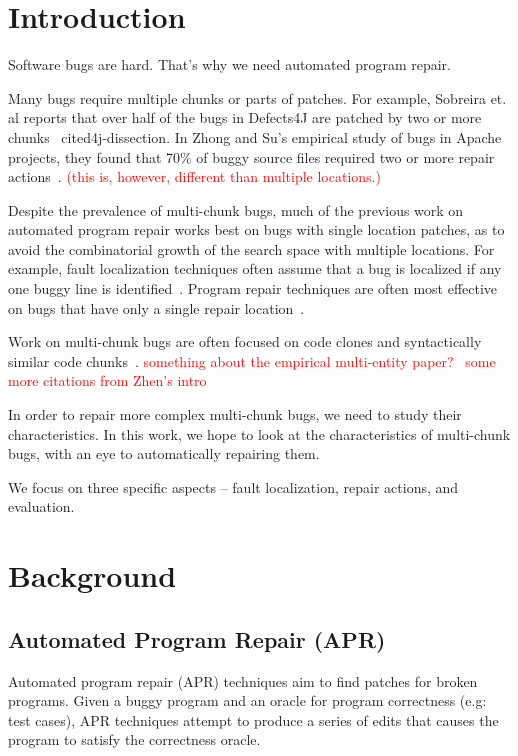 \documentclass[sigconf, timestamp-false, anonymous=true]{acmart}
\newcommand\todo[1]{\textcolor{red}{#1}}
\begin{document}

\maketitle

\section{Introduction}

Software bugs are hard. That's why we need automated program repair.

Many bugs require multiple chunks or parts of patches. For example, Sobreira et. al reports that over half of the bugs in Defects4J are patched by two or more chunks ~cite{d4j-dissection}. In Zhong and Su's empirical study of bugs in Apache projects, they found that 70\% of buggy source files required two or more repair actions~\cite{zhong2015}. \todo{(this is, however, different than multiple locations.)}

Despite the prevalence of multi-chunk bugs, much of the previous work on automated program repair works best on bugs with single location patches, as to avoid the combinatorial growth of the search space with multiple locations. For example, fault localization techniques often assume that a bug is localized if any one buggy line is identified~\cite{fl-survey-wong}. Program repair techniques are often most effective on bugs that have only a single repair location~\cite{rsrepair, ae, hdrepair}.

Work on multi-chunk bugs are often focused on code clones and syntactically similar code chunks~\cite{saha2019harnessing,jiang2019cmsuggester}. \todo{something about the empirical multi-entity paper?~\cite{wang2018}} \todo{some more citations from Zhen's intro~\cite{fl-multi-faults, patch-correctness, Le2018}}

In order to repair more complex multi-chunk bugs, we need to study their characteristics. In this work, we hope to look at the characteristics of multi-chunk bugs, with an eye to automatically repairing them.

We focus on three specific aspects -- fault localization, repair actions, and evaluation.


\section{Background}
\subsection{Automated Program Repair (APR)}
Automated program repair (APR) techniques aim to find patches for broken programs. 
Given a buggy program and an oracle for program correctness (e.g: test cases), APR 
techniques attempt to produce a series of edits that causes the program to satisfy the 
correctness oracle. 
\end{document}
